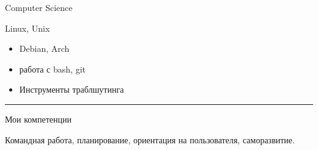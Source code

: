 \documentclass[a4paper,10pt]{article}
\newlength{\cvcolumngapwidth}
\newlength{\cvleftcolumnwidth}
\newlength{\cvrightcolumnwidth}
\newcommand{\cvsectionstyle}[1]{{\normalsize\cvsectionfont\textcolor{cvsectioncolor}{#1}}}
\newcommand{\cvheadingstyle}[1]{{\normalsize\cvheadingfont\textcolor{cvheadingcolor}{#1}}}
\newlength{\cvafteritemskipamount}
\newlength{\cvaftersectionskipamount}
\newlength{\cvbetweensectionandheadingextraskipamount}
\newlength{\cvparskip}
\newcommand{\cvsection}[1]{
    \begin{minipage}[t]{\cvleftcolumnwidth}
        \raggedleft\cvsectionstyle{#1}
    \end{minipage}%
    \hspace{\cvcolumngapwidth}%
    \begin{minipage}[t]{\cvrightcolumnwidth}
        \textcolor{cvrulecolor}{\rule{\cvrightcolumnwidth}{0.3mm}}
    \end{minipage}

    \vspace{\cvaftersectionskipamount}
}
\newcommand{\cvitem}[2]{
    \begin{minipage}[t]{\cvleftcolumnwidth}
        \raggedleft #1
    \end{minipage}%
    \hspace{\cvcolumngapwidth}%
    \begin{minipage}[t]{\cvrightcolumnwidth}
        \setlength{\parskip}{\cvparskip} #2
    \end{minipage}

    \vspace{\cvafteritemskipamount}
}
\begin{document}
\cvitem{
    \cvheadingstyle{Computer Science}
}{
    Linux, Unix
    \begin{itemize}
        \item Debian, Arch
        \item работа с bash, git
        \item Инструменты траблшутинга
    \end{itemize}
}



\cvsection{}

\vspace{\cvbetweensectionandheadingextraskipamount}

\cvitem{
    \cvheadingstyle{Мои компетенции}
}{
    Командная работа, планирование, ориентация на пользователя, саморазвитие. 
}
\end{document}
